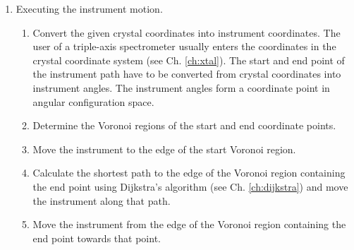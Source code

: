 \begin{enumerate}
	\item Executing the instrument motion.
	\begin{enumerate}
		\item Convert the given crystal coordinates into instrument coordinates.
			The user of a triple-axis spectrometer usually enters the coordinates in the crystal coordinate system
			(see Ch. \ref{ch:xtal}). The start and end point of the instrument path have to be converted from crystal
			coordinates into instrument angles. The instrument angles form a coordinate point in angular configuration
			space.
		\item Determine the Voronoi regions of the start and end coordinate points.
		\item Move the instrument to the edge of the start Voronoi region.
		\item Calculate the shortest path to the edge of the Voronoi region containing the end point using Dijkstra's algorithm
			(see Ch. \ref{ch:dijkstra}) and move the instrument along that path.
		\item Move the instrument from the edge of the Voronoi region containing the end point towards that point.
	\end{enumerate}
\end{enumerate}
